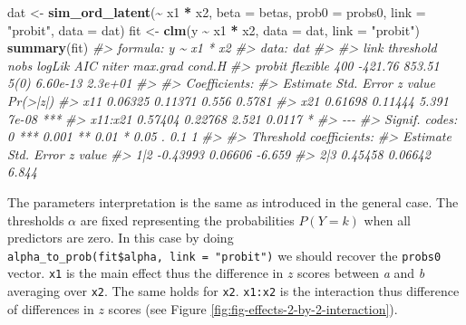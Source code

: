 \documentclass[
  man,floatsintext]{apa6}
\newenvironment{Shaded}{\begin{snugshade}}{\end{snugshade}}
\newcommand{\AttributeTok}[1]{\textcolor[rgb]{0.13,0.29,0.53}{#1}}
\newcommand{\CommentTok}[1]{\textcolor[rgb]{0.56,0.35,0.01}{\textit{#1}}}
\newcommand{\FunctionTok}[1]{\textcolor[rgb]{0.13,0.29,0.53}{\textbf{#1}}}
\newcommand{\NormalTok}[1]{#1}
\newcommand{\OtherTok}[1]{\textcolor[rgb]{0.56,0.35,0.01}{#1}}
\newcommand{\SpecialCharTok}[1]{\textcolor[rgb]{0.81,0.36,0.00}{\textbf{#1}}}
\newcommand{\StringTok}[1]{\textcolor[rgb]{0.31,0.60,0.02}{#1}}
\begin{document}
\begin{Shaded}
\begin{Highlighting}[]
\NormalTok{dat }\OtherTok{\textless{}{-}} \FunctionTok{sim\_ord\_latent}\NormalTok{(}\SpecialCharTok{\textasciitilde{}}\NormalTok{ x1 }\SpecialCharTok{*}\NormalTok{ x2, }\AttributeTok{beta =}\NormalTok{ betas, }\AttributeTok{prob0 =}\NormalTok{ probs0, }\AttributeTok{link =} \StringTok{"probit"}\NormalTok{, }\AttributeTok{data =}\NormalTok{ dat)}
\NormalTok{fit }\OtherTok{\textless{}{-}} \FunctionTok{clm}\NormalTok{(y }\SpecialCharTok{\textasciitilde{}}\NormalTok{ x1 }\SpecialCharTok{*}\NormalTok{ x2, }\AttributeTok{data =}\NormalTok{ dat, }\AttributeTok{link =} \StringTok{"probit"}\NormalTok{)}
\FunctionTok{summary}\NormalTok{(fit)}
\CommentTok{\#\textgreater{} formula: y \textasciitilde{} x1 * x2}
\CommentTok{\#\textgreater{} data:    dat}
\CommentTok{\#\textgreater{} }
\CommentTok{\#\textgreater{}  link   threshold nobs logLik  AIC    niter max.grad cond.H }
\CommentTok{\#\textgreater{}  probit flexible  400  {-}421.76 853.51 5(0)  6.60e{-}13 2.3e+01}
\CommentTok{\#\textgreater{} }
\CommentTok{\#\textgreater{} Coefficients:}
\CommentTok{\#\textgreater{}         Estimate Std. Error z value Pr(\textgreater{}|z|)    }
\CommentTok{\#\textgreater{} x11      0.06325    0.11371   0.556   0.5781    }
\CommentTok{\#\textgreater{} x21      0.61698    0.11444   5.391    7e{-}08 ***}
\CommentTok{\#\textgreater{} x11:x21  0.57404    0.22768   2.521   0.0117 *  }
\CommentTok{\#\textgreater{} {-}{-}{-}}
\CommentTok{\#\textgreater{} Signif. codes:  0 \textquotesingle{}***\textquotesingle{} 0.001 \textquotesingle{}**\textquotesingle{} 0.01 \textquotesingle{}*\textquotesingle{} 0.05 \textquotesingle{}.\textquotesingle{} 0.1 \textquotesingle{} \textquotesingle{} 1}
\CommentTok{\#\textgreater{} }
\CommentTok{\#\textgreater{} Threshold coefficients:}
\CommentTok{\#\textgreater{}     Estimate Std. Error z value}
\CommentTok{\#\textgreater{} 1|2 {-}0.43993    0.06606  {-}6.659}
\CommentTok{\#\textgreater{} 2|3  0.45458    0.06642   6.844}
\end{Highlighting}
\end{Shaded}

\normalsize

The parameters interpretation is the same as introduced in the general case. The thresholds \(\alpha\) are fixed representing the probabilities \(P(Y = k)\) when all predictors are zero. In this case by doing \texttt{alpha\_to\_prob(fit\$alpha,\ link\ =\ "probit")} we should recover the \texttt{probs0} vector. \texttt{x1} is the main effect thus the difference in \(z\) scores between \emph{a} and \emph{b} averaging over \texttt{x2}. The same holds for \texttt{x2}. \texttt{x1:x2} is the interaction thus difference of differences in \(z\) scores (see Figure \ref{fig:fig-effects-2-by-2-interaction}).
\end{document}
